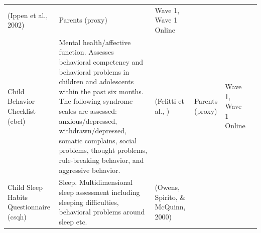 \documentclass[
]{book}
\begin{document}
\begin{longtable}[]{@{}llllll@{}}
\begin{minipage}[t]{0.15\columnwidth}
(Ippen et al., 2002)\strut
\end{minipage} & \begin{minipage}[t]{0.16\columnwidth}\raggedright
Parents (proxy)\strut
\end{minipage} & \begin{minipage}[t]{0.06\columnwidth}\raggedright
Wave 1, Wave 1 Online\strut
\end{minipage} & \begin{minipage}[t]{0.10\columnwidth}\raggedright
\strut
\end{minipage}\tabularnewline
\begin{minipage}[t]{0.18\columnwidth}\raggedright
Child Behavior Checklist (cbcl)\strut
\end{minipage} & \begin{minipage}[t]{0.18\columnwidth}\raggedright
Mental health/affective function. Assesses behavioral competency and behavioral problems in children and adolescents within the past six months. The following syndrome scales are assessed: anxious/depressed, withdrawn/depressed, somatic complains, social problems, thought problems, rule-breaking behavior, and aggressive behavior.\strut
\end{minipage} & \begin{minipage}[t]{0.15\columnwidth}\raggedright
(Felitti et al., )\strut
\end{minipage} & \begin{minipage}[t]{0.16\columnwidth}\raggedright
Parents (proxy)\strut
\end{minipage} & \begin{minipage}[t]{0.06\columnwidth}\raggedright
Wave 1, Wave 1 Online\strut
\end{minipage} & \begin{minipage}[t]{0.10\columnwidth}\raggedright
\strut
\end{minipage}\tabularnewline
\begin{minipage}[t]{0.18\columnwidth}\raggedright
Child Sleep Habits Questionnaire (csqh)\strut
\end{minipage} & \begin{minipage}[t]{0.18\columnwidth}\raggedright
Sleep. Multidimensional sleep assessment including sleeping difficulties, behavioral problems around sleep etc.\strut
\end{minipage} & \begin{minipage}[t]{0.15\columnwidth}\raggedright
(Owens, Spirito, \& McQuinn, 2000)\strut
\end{minipage} & \begin{minipage}[t]{0.16\columnwidth}\raggedright

\end{minipage}
\end{longtable}
\end{document}
